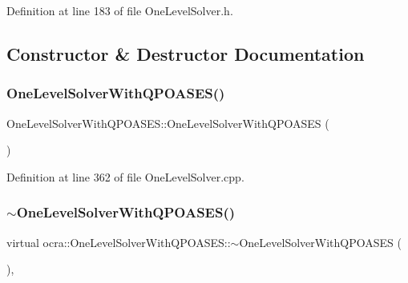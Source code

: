 Definition at line 183 of file One\+Level\+Solver.\+h.



\subsection{Constructor \& Destructor Documentation}
\hypertarget{classocra_1_1OneLevelSolverWithQPOASES_a5540c732d87204ed0779b3fbaa5667b7}{}\label{classocra_1_1OneLevelSolverWithQPOASES_a5540c732d87204ed0779b3fbaa5667b7} 
\subsubsection{\texorpdfstring{One\+Level\+Solver\+With\+Q\+P\+O\+A\+S\+E\+S()}{OneLevelSolverWithQPOASES()}}
{\footnotesize\ttfamily One\+Level\+Solver\+With\+Q\+P\+O\+A\+S\+E\+S\+::\+One\+Level\+Solver\+With\+Q\+P\+O\+A\+S\+ES (\begin{DoxyParamCaption}{ }\end{DoxyParamCaption})}



Definition at line 362 of file One\+Level\+Solver.\+cpp.

\hypertarget{classocra_1_1OneLevelSolverWithQPOASES_adf42bcbdf5c169be4fe51c025ed49c53}{}\label{classocra_1_1OneLevelSolverWithQPOASES_adf42bcbdf5c169be4fe51c025ed49c53} 
\subsubsection{\texorpdfstring{$\sim$\+One\+Level\+Solver\+With\+Q\+P\+O\+A\+S\+E\+S()}{~OneLevelSolverWithQPOASES()}}
{\footnotesize\ttfamily virtual ocra\+::\+One\+Level\+Solver\+With\+Q\+P\+O\+A\+S\+E\+S\+::$\sim$\+One\+Level\+Solver\+With\+Q\+P\+O\+A\+S\+ES (\begin{DoxyParamCaption}{ }\end{DoxyParamCaption})\hspace{0.3cm}{\ttfamily [inline]}, {\ttfamily [virtual]}}



